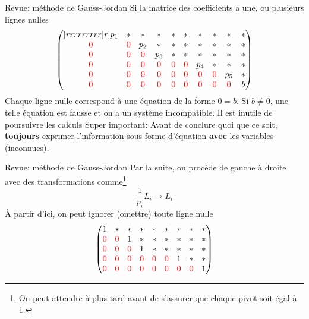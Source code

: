 \documentclass[french, handout]{beamer}
\begin{document}
\begin{frame}{Revue: méthode de Gauss-Jordan}
Si la matrice des coefficients a une, ou plusieurs lignes nulles	
\[
\begin{pmatrix}[rrrrrrrrr|r]
p_1 & *  & * & * & * & * & * & * & * &* \\
{\color{red}{0}} & {\color{red}{0}} & p_2 & * & * & * & * & * & * & * \\
{\color{red}{0}} & {\color{red}{0}} & {\color{red}{0}} & p_3 & * & * & * & * & * & *\\ 
{\color{red}{0}} & {\color{red}{0}} & {\color{red}{0}} & {\color{red}{0}} & {\color{red}{0}} & {\color{red}{0}} & p_4 & * & * & * \\ 
{\color{red}{0}} & {\color{red}{0}} & {\color{red}{0}} & {\color{red}{0}} & {\color{red}{0}} & {\color{red}{0}} & {\color{red}{0}} & {\color{red}{0}} & p_5 & * \\ 
{\color{red}{0}} & {\color{red}{0}} & {\color{red}{0}} & {\color{red}{0}} & {\color{red}{0}} & {\color{red}{0}} & {\color{red}{0}} & {\color{red}{0}} & {\color{red}{0}} & b
\end{pmatrix}
\]	
Chaque ligne nulle correspond à une équation de la forme $0=b$. Si $b\neq 0$, une telle équation est fausse et on a un système incompatible. Il est inutile de poursuivre les calculs
\vfill
{\color{red}Super important:} Avant de conclure quoi que ce soit, \textbf{toujours} exprimer l'information sous forme d'équation \textbf{avec} les variables (inconnues).
\end{frame}	



\begin{frame}{Revue: méthode de Gauss-Jordan}
Par la suite, on procède de gauche à droite avec des transformations comme\footnote{On peut attendre à plus 
tard avant de s'assurer que chaque pivot soit égal à 1.}
\Large
\[
\frac{1}{p_i} L_i \rightarrow L_i
\]
\normalsize
À partir d'ici, on peut ignorer (omettre) toute ligne nulle	
\[
\begin{pmatrix}
1 & *  & * & * & * & * & * & * & * \\
{\color{red}{0}} & {\color{red}{0}} & 1 & * & * & * & * & * & * \\
{\color{red}{0}} & {\color{red}{0}} & {\color{red}{0}} & 1 & * & * & * & * & * \\ 
{\color{red}{0}} & {\color{red}{0}} & {\color{red}{0}} & {\color{red}{0}} & {\color{red}{0}} & {\color{red}{0}} & 1 & * & * \\ 
{\color{red}{0}} & {\color{red}{0}} & {\color{red}{0}} & {\color{red}{0}} & {\color{red}{0}} & {\color{red}{0}} & {\color{red}{0}} & {\color{red}{0}} & 1 \\ 
\end{pmatrix}
\]	
\end{frame}	
\end{document}
